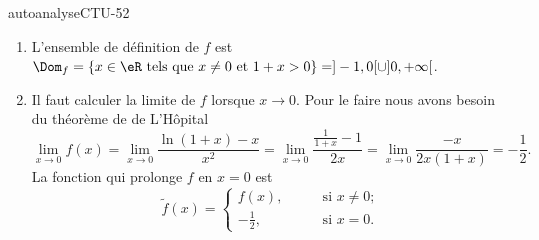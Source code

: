 
\begin{corrige}{autoanalyseCTU-52}

 
\begin{enumerate}
\item L'ensemble de définition de $f$  est $\Dom_f = \{x\in\eR\text{ tels que } x\neq 0\text{ et } 1+x >0\} = ]-1,0[\cup]0,+\infty[$.
\item Il faut calculer la limite de $f$ lorsque $x\to 0$. Pour le faire nous avons besoin du théorème de de L'H\^opital
  \begin{equation*}
    \lim_{x\to 0} f(x) = \lim_{x\to 0}\frac{\ln(1+x)-x}{x^2} = \lim_{x\to 0}\frac{\frac{1}{1+x}-1}{2x} = \lim_{x\to 0}\frac{-x}{2x(1+x)} = -\frac{1}{2}.
  \end{equation*}
La fonction qui prolonge $f$ en $x=0$ est 
\begin{equation*}
  \tilde f(x) = 
  \begin{cases}
    f(x), &\qquad \text{si } x\neq 0 ;\\
    -\frac{1}{2}, &\qquad \text{si } x= 0. 
  \end{cases}
\end{equation*}
\end{enumerate}


\end{corrige}   
